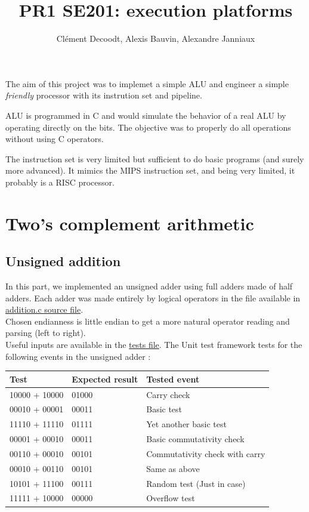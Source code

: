 \documentclass[a4paper]{report}
\author{Clément Decoodt, Alexis Bauvin, Alexandre Janniaux}
\title{PR1 SE201: execution platforms}
\begin{document}
\maketitle

The aim of this project was to implemet a simple ALU and engineer a simple
\emph{friendly} processor with its instrution set and pipeline.

ALU is programmed in C and would simulate the behavior of a real ALU by
operating directly on the bits. The objective was to properly do all operations
without using C operators.

The instruction set is very limited but sufficient to do basic programs (and
surely more advanced). It mimics the MIPS instruction set, and being very
limited, it probably is a RISC processor.

\section{Two's complement arithmetic}

\subsection{Unsigned addition}

	In this part, we implemented an unsigned adder using full adders made of half adders. Each adder was made entirely by logical operators in the file available in \href{https://github.com/friendshipismagic/friendly-computing-machine/blob/master/proj1/src/addition.c}{addition.c source file}. \\
	
	Chosen endianness is little endian to get a more natural operator reading and parsing (left to right). \\
	
	Useful inputs are available in the \href{https://github.com/friendshipismagic/friendly-computing-machine/blob/master/proj1/src/tests.c}{tests file}. The Unit test framework tests for the following events in the unsigned adder :

\begin{center}
	\begin{tabular}{|l|l|l|}
		\hline
		Test & Expected result & Tested event \\
		\hline \hline
		10000 + 10000 & 01000 & Carry check \\
		00010 + 00001 & 00011 & Basic test \\
		11110 + 11110 & 01111 & Yet another basic test \\
		00001 + 00010 & 00011 & Basic commutativity check \\
		00110 + 00010 & 00101 & Commutativity check with carry \\
		00010 + 00110 & 00101 & Same as above \\
		10101 + 11100 & 00111 & Random test (Just in case)\\
		11111 + 10000 & 00000 & Overflow test \\
		\hline
	\end{tabular}
\end{center}
\end{document}
